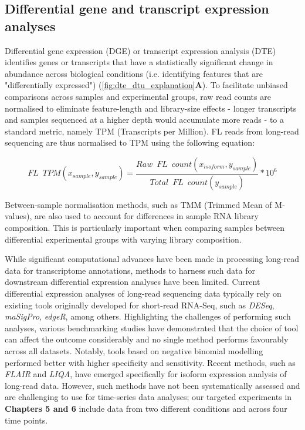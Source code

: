 \subsection{Differential gene and transcript expression analyses}
Differential gene expression (DGE) or transcript expression analysis (DTE) identifies genes or transcripts that have a statistically significant change in abundance across biological conditions (i.e. identifying features that are "differentially expressed") (\cref{fig:dte_dtu_explanation}\textbf{A}). To facilitate unbiased comparisons across samples and experimental groups, raw read counts are normalised to eliminate feature-length and library-size effects - longer transcripts and samples sequenced at a higher depth would accumulate more reads - to a standard metric, namely TPM (Transcripts per Million). FL reads from long-read sequencing are thus normalised to TPM using the following equation: 

\begin{myequation}[!h]
	\begin{equation}
		FL\;\:TPM (x_{sample},y_{sample})=\frac{Raw\;\:FL\;\:count (x_{isoform},y_{sample})}{Total\;\:FL\;\:count (y_{sample})} *10^6
	\end{equation}
\end{myequation}

Between-sample normalisation methods, such as TMM\cite{Robinson2010} (Trimmed Mean of M-values), are also used to account for differences in sample RNA library composition. This is particularly important when comparing samples between differential experimental groups with varying library composition. 

While significant computational advances have been made in processing long-read data for transcriptome annotations, methods to harness such data for downstream differential expression analyses have been limited. Current differential expression analyses of long-read sequencing data typically rely on existing tools originally developed for short-read RNA-Seq\cite{Amarasinghe2020}, such as \textit{DESeq}, \textit{maSigPro}, \textit{edgeR}, among others. Highlighting the challenges of performing such analyses, various benchmarking studies have demonstrated that the choice of tool can affect the outcome considerably and no single method performs favourably across all datasets. Notably, tools based on negative binomial modelling performed better with higher specificity and sensitivity\cite{Rapaport2013}. Recent methods, such as \textit{FLAIR} and \textit{LIQA}\cite{Hu2021}, have emerged specifically for isoform expression analysis of long-read data. However, such methods have not been systematically assessed and are challenging to use for time-series data analyses; our targeted experiments in \textbf{Chapters 5 and 6} include data from two different conditions and across four time points. 

